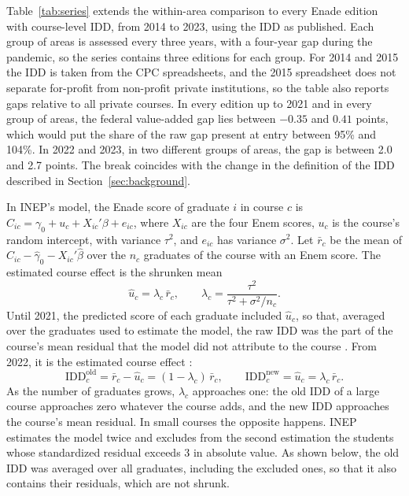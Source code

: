 \documentclass[12pt,letterpaper]{article}
\begin{document}
Table~\ref{tab:series} extends the within-area comparison to every Enade edition with course-level IDD, from 2014 to 2023, using the IDD as published. Each group of areas is assessed every three years, with a four-year gap during the pandemic, so the series contains three editions for each group. For 2014 and 2015 the IDD is taken from the CPC spreadsheets, and the 2015 spreadsheet does not separate for-profit from non-profit private institutions, so the table also reports gaps relative to all private courses. In every edition up to 2021 and in every group of areas, the federal value-added gap lies between $-0.35$ and $0.41$ points, which would put the share of the raw gap present at entry between 95\% and 104\%. In 2022 and 2023, in two different groups of areas, the gap is between 2.0 and 2.7 points. The break coincides with the change in the definition of the IDD described in Section~\ref{sec:background}.

In INEP's model, the Enade score of graduate $i$ in course $c$ is $C_{ic}=\gamma_0+u_c+X_{ic}'\beta+e_{ic}$, where $X_{ic}$ are the four Enem scores, $u_c$ is the course's random intercept, with variance $\tau^2$, and $e_{ic}$ has variance $\sigma^2$. Let $\bar r_c$ be the mean of $C_{ic}-\hat\gamma_0-X_{ic}'\hat\beta$ over the $n_c$ graduates of the course with an Enem score. The estimated course effect is the shrunken mean
\begin{equation}\label{eq:blup}
\hat u_c=\lambda_c\,\bar r_c,\qquad \lambda_c=\frac{\tau^2}{\tau^2+\sigma^2/n_c}.
\end{equation}
Until 2021, the predicted score of each graduate included $\hat u_c$, so that, averaged over the graduates used to estimate the model, the raw IDD was the part of the course's mean residual that the model did not attribute to the course \citep{terhaar2021}. From 2022, it is the estimated course effect \citep{inep2023idd}:
\begin{equation}\label{eq:idd}
\mathrm{IDD}^{\mathrm{old}}_c=\bar r_c-\hat u_c=(1-\lambda_c)\,\bar r_c,\qquad \mathrm{IDD}^{\mathrm{new}}_c=\hat u_c=\lambda_c\,\bar r_c .
\end{equation}
As the number of graduates grows, $\lambda_c$ approaches one: the old IDD of a large course approaches zero whatever the course adds, and the new IDD approaches the course's mean residual. In small courses the opposite happens. INEP estimates the model twice and excludes from the second estimation the students whose standardized residual exceeds 3 in absolute value. As shown below, the old IDD was averaged over all graduates, including the excluded ones, so that it also contains their residuals, which are not shrunk.
\end{document}
